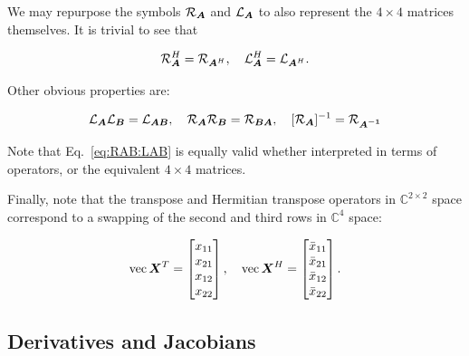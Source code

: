 \documentclass[useAMS,usenatbib]{mn2e}
\newcommand{\COMPLEX}{\mathbb{C}}
\newcommand{\mat}[1]{{\bmath{#1}}}
\begin{document}


We may repurpose the symbols $\Rop{\mat{A}}$ and $\Lop{\mat{A}}$ to also represent the $4\times4$ matrices 
themselves. It is trivial to see that

\begin{equation}
\Rop{\mat{A}}^H = \Rop{\mat{A}^H},~~~\Lop{\mat{A}}^H = \Lop{\mat{A}^H}.
\end{equation}



Other obvious properties are:

\begin{equation}
\label{eq:RAB:LAB}
\Lop{\mat{A}}\Lop{\mat{B}} = \Lop{\mat{AB}},~~~\Rop{\mat{A}}\Rop{\mat{B}} = \Rop{\mat{BA}},~~~[\Rop{\mat{A}}]^{-1} = \Rop{\mat{A^{-1}}}
\end{equation}

Note that Eq.~\ref{eq:RAB:LAB} is equally valid whether interpreted in terms of operators, or the equivalent $4\times4$ matrices.

Finally, note that the transpose and Hermitian transpose operators in $\COMPLEX^{2\times2}$ space correspond to a swapping
of the second and third rows in $\COMPLEX^4$ space:

\begin{equation}
\label{eq:vec:XH}
\VEC{\mat{X}^T} = \Matrix{c}{x_{11}\\x_{21}\\x_{12}\\x_{22}},~~~
\VEC{\mat{X}^H} = \Matrix{c}{\bar{x}_{11}\\\bar{x}_{21}\\\bar{x}_{12}\\\bar{x}_{22}}.
\end{equation}

\subsection{Derivatives and Jacobians}
\end{document}
